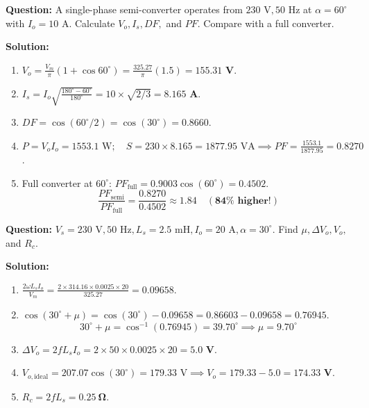 \documentclass[11pt,a4paper]{article}
\begin{document}
\begin{examplebox}
\textbf{Question:} A single-phase semi-converter operates from $230\text{ V}, 50\text{ Hz}$ at $\alpha = 60^\circ$ with $I_o = 10\text{ A}$. Calculate $V_o, I_s, DF,$ and $PF$. Compare with a full converter.

\tcbline
\textbf{Solution:}
\begin{enumerate}[leftmargin=*]
  \item $V_o = \frac{V_m}{\pi}(1 + \cos 60^\circ) = \frac{325.27}{\pi} (1.5) = \mathbf{155.31\text{ V}}$.
  \item $I_s = I_o \sqrt{\frac{180^\circ - 60^\circ}{180^\circ}} = 10 \times \sqrt{2/3} = \mathbf{8.165\text{ A}}$.
  \item $DF = \cos(60^\circ / 2) = \cos(30^\circ) = \mathbf{0.8660}$.
  \item $P = V_o I_o = 1553.1\text{ W}; \quad S = 230 \times 8.165 = 1877.95\text{ VA} \implies PF = \frac{1553.1}{1877.95} = \mathbf{0.8270}$.
  \item Full converter at $60^\circ$: $PF_{\text{full}} = 0.9003 \cos(60^\circ) = \mathbf{0.4502}$.
  \[
  \frac{PF_{\text{semi}}}{PF_{\text{full}}} = \frac{0.8270}{0.4502} \approx \mathbf{1.84} \quad (\mathbf{84\% \text{ higher!}})
  \]
\end{enumerate}
\end{examplebox}

\begin{examplebox}
\textbf{Question:} $V_s = 230\text{ V}, 50\text{ Hz}, L_s = 2.5\text{ mH}, I_o = 20\text{ A}, \alpha = 30^\circ$. Find $\mu, \Delta V_o, V_o,$ and $R_c$.

\tcbline
\textbf{Solution:}
\begin{enumerate}[leftmargin=*]
  \item $\frac{2\omega L_s I_o}{V_m} = \frac{2 \times 314.16 \times 0.0025 \times 20}{325.27} = 0.09658$.
  \item $\cos(30^\circ + \mu) = \cos(30^\circ) - 0.09658 = 0.86603 - 0.09658 = 0.76945$.
  \[
  30^\circ + \mu = \cos^{-1}(0.76945) = 39.70^\circ \implies \mu = \mathbf{9.70^\circ}
  \]
  \item $\Delta V_o = 2 f L_s I_o = 2 \times 50 \times 0.0025 \times 20 = \mathbf{5.0\text{ V}}$.
  \item $V_{o,\text{ideal}} = 207.07 \cos(30^\circ) = 179.33\text{ V} \implies V_o = 179.33 - 5.0 = \mathbf{174.33\text{ V}}$.
  \item $R_c = 2 f L_s = \mathbf{0.25\ \Omega}$.
\end{enumerate}
\end{examplebox}
\end{document}
